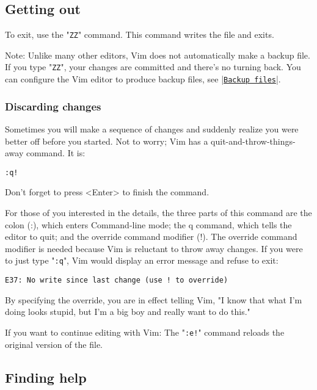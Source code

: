 \subsection{Getting out}

To exit, use the "\texttt{ZZ}" command.  This command writes the file and exits.

Note:\newline
Unlike many other editors, Vim does not automatically make a backup file.
If you type "\texttt{ZZ}", your changes are committed and there's no turning back.
You can configure the Vim editor to produce backup files, see |\hyperref[Backup files]{\texttt{Backup files}}|.

\subsubsection{Discarding changes}

Sometimes you will make a sequence of changes and suddenly realize you were better off before you started.
Not to worry; Vim has a quit-and-throw-things-away command.
It is: 

	\begin{Verbatim}[samepage=true]
	:q!
	\end{Verbatim}

Don't forget to press <Enter> to finish the command.

For those of you interested in the details, the three parts of this command are the colon (:), which enters Command-line mode; the q command, which tells the editor to quit; and the override command modifier (!).
The override command modifier is needed because Vim is reluctant to throw away changes.
If you were to just type "\texttt{:q}", Vim would display an error message and refuse to exit: 

		\begin{Verbatim}[samepage=true]
    E37: No write since last change (use ! to override) 
		\end{Verbatim}

By specifying the override, you are in effect telling Vim, "I know that what I'm doing looks stupid, but I'm a big boy and really want to do this."

If you want to continue editing with Vim: The "\texttt{:e!}" command reloads the original version of the file.

\subsection{Finding help}

